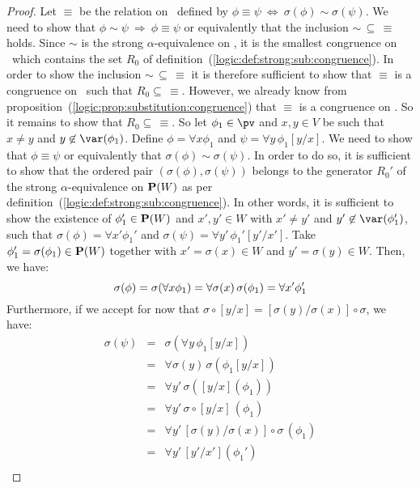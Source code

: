 \noindent
\begin{proof}
Let $\equiv$ be the relation on \pv\ defined by $\phi\equiv\psi\
\Leftrightarrow\ \sigma(\phi)\sim\sigma(\psi)$. We need to show that
$\phi\sim\psi\ \Rightarrow\ \phi\equiv\psi$ or equivalently that the
inclusion $\sim\,\subseteq\,\equiv$ holds. Since $\sim$ is the
strong $\alpha$-equivalence on \pv, it is the smallest congruence
on \pv\ which contains the set $R_{0}$ of
definition~(\ref{logic:def:strong:sub:congruence}). In order to show
the inclusion $\sim\,\subseteq\,\equiv$ it is therefore sufficient
to show that $\equiv$ is a congruence on \pv\ such that
$R_{0}\subseteq\,\equiv$. However, we already know from
proposition~(\ref{logic:prop:substitution:congruence}) that $\equiv$
is a congruence on \pv. So it remains to show that
$R_{0}\subseteq\,\equiv$. So let $\phi_{1}\in\pv$ and $x,y\in V$ be
such that $x\neq y$ and $y\not\in\var(\phi_{1})$. Define
$\phi=\forall x\phi_{1}$ and $\psi=\forall y\,\phi_{1}[y/x]$. We
need to show that $\phi\equiv\psi$ or equivalently that
$\sigma(\phi)\sim\sigma(\psi)$. In order to do so, it is sufficient
to show that the ordered pair $(\sigma(\phi),\sigma(\psi))$ belongs
to the generator $R_{0}'$ of the strong $\alpha$-equivalence on
${\bf P}(W)$ as per
definition~(\ref{logic:def:strong:sub:congruence}). In other words,
it is sufficient to show the existence of $\phi_{1}'\in{\bf P}(W)$
and $x',y'\in W$ with $x'\neq y'$ and $y'\not\in\var(\phi_{1}')$,
such that $\sigma(\phi)=\forall x'\phi_{1}'$ and
$\sigma(\psi)=\forall y'\,\phi_{1}'[y'/x']$. Take
$\phi_{1}'=\sigma(\phi_{1})\in{\bf P}(W)$ together with
$x'=\sigma(x)\in W$ and $y'=\sigma(y)\in W$. Then, we have:
    \[
    \sigma(\phi)=\sigma(\forall x\phi_{1})\\
        =\forall\sigma(x)\,\sigma(\phi_{1})\\
        =\forall x'\phi_{1}'
    \]
Furthermore, if we accept for now that
$\sigma\circ[y/x]=[\sigma(y)/\sigma(x)]\circ\sigma$, we have:
    \begin{eqnarray*}
    \sigma(\psi)&=&\sigma(\forall y\,\phi_{1}[y/x])\\
    &=&\forall\sigma(y)\,\sigma(\phi_{1}[y/x])\\
    &=&\forall y'\,\sigma([y/x](\phi_{1}))\\
    &=&\forall y'\,\sigma\circ [y/x]\,(\phi_{1})\\
    &=&\forall y'\, [\sigma(y)/\sigma(x)]\circ\sigma\,(\phi_{1})\\
    &=&\forall y'\,[y'/x'](\phi_{1}')\\

\end{eqnarray*}
\end{proof}
